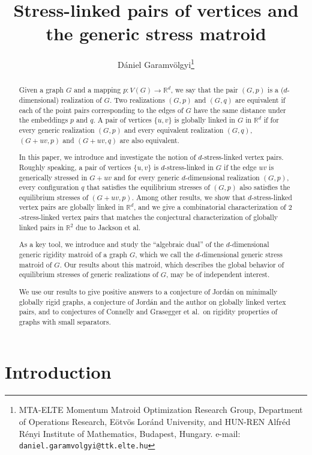 \documentclass[11pt,a4paper,dvipsnames]{scrartcl}
\title{Stress-linked pairs of vertices and the generic stress matroid}
\author{Dániel Garamvölgyi\thanks{MTA-ELTE Momentum Matroid Optimization Research Group, Department of
Operations Research, Eötvös Loránd University, and HUN-REN Alfréd Rényi Institute of Mathematics, Budapest, Hungary. e-mail: \texttt{daniel.garamvolgyi@ttk.elte.hu}}}
\date{}
\theoremstyle{definition}
\newcommand{\RR}{\mathbb{R}}
\newcommand{\strongly}[1]{${#1}$-stress-linked}
\begin{document}
\maketitle
\begin{abstract}
    Given a graph $G$ and a mapping $p : V(G) \rightarrow \RR^d$, we say that the pair $(G,p)$ is a ($d$-dimensional) realization of $G$. Two realizations $(G,p)$ and $(G,q)$ are equivalent if each of the point pairs corresponding to the edges of $G$ have the same distance under the embeddings $p$ and $q$. A pair of vertices $\{u,v\}$ is globally linked in $G$ in $\RR^d$ if for every generic realization $(G,p)$ and every equivalent realization $(G,q)$, $(G+uv,p)$ and $(G+uv,q)$ are also equivalent. %
    
    In this paper, we introduce and investigate the notion of \strongly{d} vertex pairs. Roughly speaking, a pair of vertices $\{u,v\}$ is \strongly{d} in $G$ if the edge $uv$ is generically stressed in $G+uv$ and for every generic $d$-dimensional realization $(G,p)$, every configuration $q$ that satisfies the equilibrium stresses of $(G,p)$ also satisfies the equilibrium stresses of $(G+uv,p)$. Among other results, we show that \strongly{d} vertex pairs are globally linked in $\RR^d$, and we give a combinatorial characterization of \strongly{2} vertex pairs that matches the conjectural characterization of globally linked pairs in $\RR^2$ due to Jackson et al.
    
    As a key tool, we introduce and study the  ``algebraic dual'' of the $d$-dimensional generic rigidity matroid of a graph $G$, which we call the $d$-dimensional generic stress matroid of $G$. Our results about this matroid, which describes the global behavior of equilibrium stresses of generic realizations of $G$, may be of independent interest.
    
    We use our results to give positive answers to a conjecture of Jordán on minimally globally rigid graphs, a conjecture of Jordán and the author on globally linked vertex pairs, and to conjectures of Connelly and Grasegger et al.\ on rigidity properties of graphs with small separators.  
\end{abstract}

\newpage

\tableofcontents

\newpage

\section{Introduction}
\end{document}
